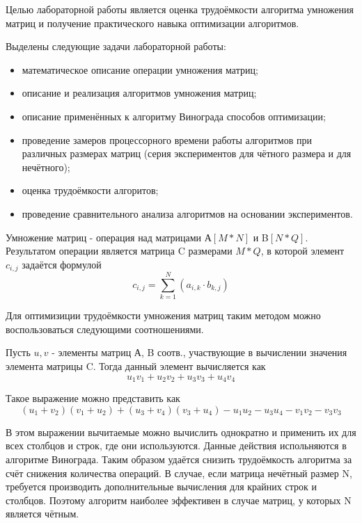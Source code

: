 Целью лабораторной работы является оценка трудоёмкости алгоритма умножения матриц и получение
практического навыка оптимизации алгоритмов.

Выделены следующие задачи лабораторной работы:

\begin{itemize}
\item математическое описание операции умножения матриц;
\item описание и реализация алгоритмов умножения матриц;
\item описание применённых к алгоритму Винограда способов оптимизации;
\item проведение замеров процессорного времени работы алгоритмов при различных размерах матриц 
(серия экспериментов для чётного размера и для нечётного);
\item оценка трудоёмкости алгоритов;
\item проведение сравнительного анализа алгоритмов на основании экспериментов.
\end{itemize}

Умножение матриц - операция над матрицами А$[M*N] $ и B$[N*Q]$. Результатом операции является матрица C размерами $ M*Q $, в которой элемент $c_{i,j}$ задаётся формулой
\begin{equation} 
	c_{i,j} = \sum_{k=1}^{N}(a_{i,k} \cdot b_{k,j})
\end{equation}

Для оптимизиции трудоёмкости умножения матриц таким методом можно воспользоваться следующими соотношениями.

Пусть $ u, v $ - элементы матриц А, B соотв., участвующие в вычислении значения элемента матрицы C. Тогда данный элемент вычисляется как 
\begin{equation} 
	u_{1}v_{1} + u_{2}v_{2} + u_{3}v_{3} + u_{4}v_{4}
\end{equation}

Такое выражение можно представить как 
\begin{equation} 
	(u_{1} + v_{2})(v_{1} + u_{2}) + (u_{3} + v_{4})(v_{3} + u_{4}) - u_{1}u_{2} - u_{3}u_{4} - v_{1}v_{2} - v_{3}v_{3}
\end{equation}

В этом выражении вычитаемые можно вычислить однократно и применить их для всех столбцов и строк, где они используются. Данные действия испольняются в алгоритме Винограда. Таким образом удаётся снизить трудоёмкость алгоритма за счёт снижения количества операций. В случае, если матрица нечётный размер N, требуется производить дополнительные вычисления для крайних строк и столбцов. Поэтому алгоритм наиболее эффективен в случае матриц, у которых N является чётным.

